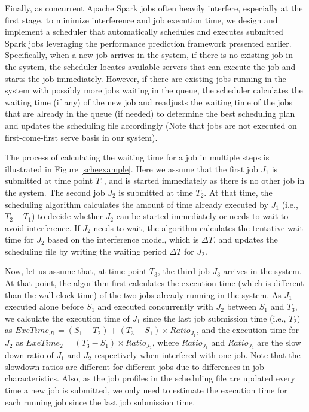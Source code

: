 Finally, as concurrent Apache Spark jobs often heavily interfere, especially at the first stage, to minimize interference and job execution time, we design and implement a scheduler that automatically schedules and executes submitted Spark jobs leveraging the performance prediction framework presented earlier. Specifically, when a new job arrives in the system, if there is no existing job in the system, the scheduler locates available servers that can execute the job and starts the job immediately. However, if there are existing jobs running in the system with possibly more jobs waiting in the queue, the scheduler calculates the waiting time (if any) of the new job and readjusts the waiting time of the jobs that are already in the queue (if needed) to determine the best scheduling plan and updates the scheduling file accordingly (Note that jobs are not executed on first-come-first serve basis in our system). 

\noindent
The process of calculating the waiting time for a job in multiple steps is illustrated in Figure \ref{scheexample}. Here we assume that the first job $J_1$ is submitted at time point $T_1$, and is started immediately as there is no other job in the system. The second job $J_2$ is submitted at time $T_2$. At that time, the scheduling algorithm calculates the amount of time already executed by $J_1$ (i.e., $T_2-T_1$) to decide whether $J_2$ can be started immediately or needs to wait to avoid interference. If $J_2$ needs to wait, the algorithm calculates the tentative wait time for $J_2$ based on the interference model, which is $\Delta T$, and updates the scheduling file by writing the waiting period $\Delta T$ for $J_2$.

\noindent
Now, let us assume that, at time point $T_3$, the third job $J_3$ arrives in the system. At that point, the algorithm first calculates the execution time (which is different than the wall clock time) of the two jobs already running in the system. As $J_1$ executed alone before $S_1$ and executed concurrently with $J_2$ between $S_1$ and $T_3$, we calculate the execution time of $J_1$ since the last job submission time (i.e., $T_2$) as $ExeTime_{J1} = (S_1-T_2)+(T_3-S_1) \times Ratio_{J_1}$, and the execution time for $J_2$ as $ExeTime_2 = (T_3-S_1) \times Ratio_{J_2}$, where $Ratio_{J_1}$ and $Ratio_{J_2}$ are the slow down ratio of $J_1$ and $J_2$ respectively when interfered with one job. Note that the slowdown ratios are different for different jobs due to differences in job characteristics. Also, as the job profiles in the scheduling file are updated every time a new job is submitted, we only need to estimate the execution time for each running job since the last job submission time. 

